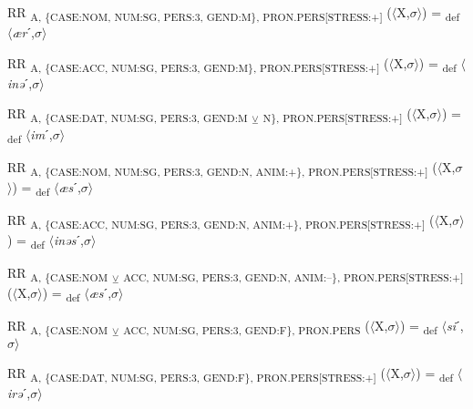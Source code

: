 {\begin{exe}
 RR \textsubscript{A, \{CASE:NOM, NUM:SG, PERS:3, GEND:M\}, PRON.PERS[STRESS:+]} ($\langle$X,$\sigma $$\rangle$) = \textsubscript{def} $\langle$\textit{ær}ˊ,$\sigma $$\rangle$
\end{exe}

\begin{exe}
 RR \textsubscript{A, \{CASE:ACC, NUM:SG, PERS:3, GEND:M\}, PRON.PERS[STRESS:+]} ($\langle$X,$\sigma $$\rangle$) = \textsubscript{def} $\langle$\textit{inə}ˊ,$\sigma $$\rangle$
\end{exe}

\begin{exe}
 RR \textsubscript{A, \{CASE:DAT, NUM:SG, PERS:3, GEND:M} \textsubscript{${\veebar}$}\textsubscript{ N\}, PRON.PERS[STRESS:+]} ($\langle$X,$\sigma $$\rangle$) = \textsubscript{def} $\langle$\textit{im}ˊ,$\sigma $$\rangle$
\end{exe}

\begin{exe}
 RR \textsubscript{A, \{CASE:NOM, NUM:SG, PERS:3, GEND:N, ANIM:+\}, PRON.PERS[STRESS:+]} ($\langle$X,$\sigma $$\rangle$) = \textsubscript{def} $\langle$\textit{æs}ˊ,$\sigma $$\rangle$
\end{exe}

\begin{exe}
 RR \textsubscript{A, \{CASE:ACC, NUM:SG, PERS:3, GEND:N, ANIM:+\}, PRON.PERS[STRESS:+]} ($\langle$X,$\sigma $$\rangle$) = \textsubscript{def} $\langle$\textit{inəs}ˊ,$\sigma $$\rangle$
\end{exe}

\begin{exe}
 RR \textsubscript{A, \{CASE:NOM} \textsubscript{${\veebar}$}\textsubscript{ ACC, NUM:SG, PERS:3, GEND:N, ANIM:–\}, PRON.PERS[STRESS:+]} ($\langle$X,$\sigma $$\rangle$) = \textsubscript{def} $\langle$\textit{æs}ˊ,$\sigma $$\rangle$
\end{exe}

\begin{exe}
 RR \textsubscript{A, \{CASE:NOM} \textsubscript{${\veebar}$}\textsubscript{ ACC, NUM:SG, PERS:3, GEND:F\}, PRON.PERS} ($\langle$X,$\sigma $$\rangle$) = \textsubscript{def} $\langle$\textit{si}ˊ,$\sigma $$\rangle$
\end{exe}

\begin{exe}
 RR \textsubscript{A, \{CASE:DAT, NUM:SG, PERS:3, GEND:F\}, PRON.PERS[STRESS:+]} ($\langle$X,$\sigma $$\rangle$) = \textsubscript{def} $\langle$\textit{irə}ˊ,$\sigma $$\rangle$
\end{exe}

}
